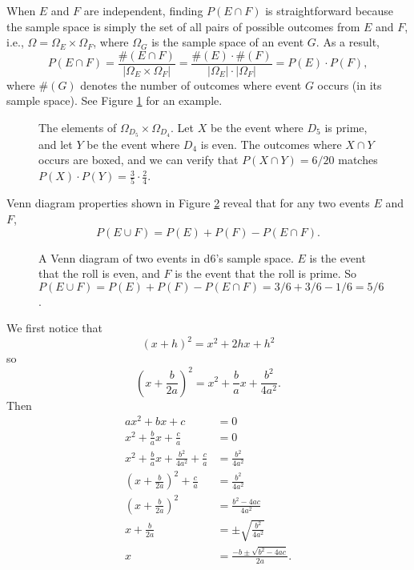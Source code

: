 \documentclass{book}
\begin{document}
\begin{exercise*}[\ref{q:cap}]
When $E$ and $F$ are independent, finding $P(E \cap F)$ is straightforward because the sample space is simply the set of all pairs of possible outcomes from $E$ and $F$, i.e., $\Omega = \Omega_E \times \Omega_F$, where $\Omega_G$ is the sample space of an event $G$. As a result,
\begin{equation*}
P(E \cap F) = \frac{\#(E \cap F)}{|\Omega_E \times \Omega_F|}
= \frac{\#(E) \cdot \#(F)}{|\Omega_E| \cdot |\Omega_F|}
= P(E) \cdot P(F),
\end{equation*} 
where $\#(G)$ denotes the number of outcomes where event $G$ occurs (in its sample space). See Figure \ref{product} for an example.
\end{exercise*}

\begin{figure}[ht]
\centering

\caption{The elements of $\Omega_{D_5} \times \Omega_{D_4}$. Let $X$ be the event where $D_5$ is prime, and let $Y$ be the event where $D_4$ is even. The outcomes where $X \cap Y$ occurs are boxed, and we can verify that $P(X \cap Y) = 6/20$ matches $P(X) \cdot P(Y) = \frac{3}{5} \cdot \frac{2}{4}$.}
\label{product}
\end{figure}


\begin{exercise*}[\ref{q:cup}]
Venn diagram properties shown in Figure \ref{vennd} reveal that for any two events $E$ and $F$, \[P(E \cup F) = P(E) + P(F) - P(E \cap F).\]
\end{exercise*}

\begin{figure}[ht]
\centering

\caption{A Venn diagram of two events in d6's sample space. $E$ is the event that the roll is even, and $F$ is the event that the roll is prime. So $P(E \cup F) = P(E) + P(F) - P(E \cap F) = 3/6 + 3/6 - 1/6 = 5/6$.}
\label{vennd}
\end{figure}

\begin{exercise*}[{\ref{completesquare}}] We first notice that
\[(x + h)^2 = x^2 + 2hx + h^2\] so \[\left(x + \frac{b}{2a}\right)^2 = x^2 + \frac{b}{a}x + \frac{b^2}{4a^2}.\] Then
\begin{align*}
ax^2 + bx + c &= 0\\
x^2 + \frac{b}{a}x + \frac{c}{a} &= 0\\
x^2 + \frac{b}{a}x + \frac{b^2}{4a^2} + \frac{c}{a} &= \frac{b^2}{4a^2}\\
\left(x + \frac{b}{2a}\right)^2 + \frac{c}{a} &= \frac{b^2}{4a^2}\\
\left(x + \frac{b}{2a}\right)^2 &= \frac{b^2-4ac}{4a^2}\\
x + \frac{b}{2a} &= \pm\sqrt{\frac{b^2}{4a^2}}\\
x &= \frac{-b \pm \sqrt{b^2 - 4ac}}{2a}.
\end{align*}
\end{exercise*}
\end{document}
